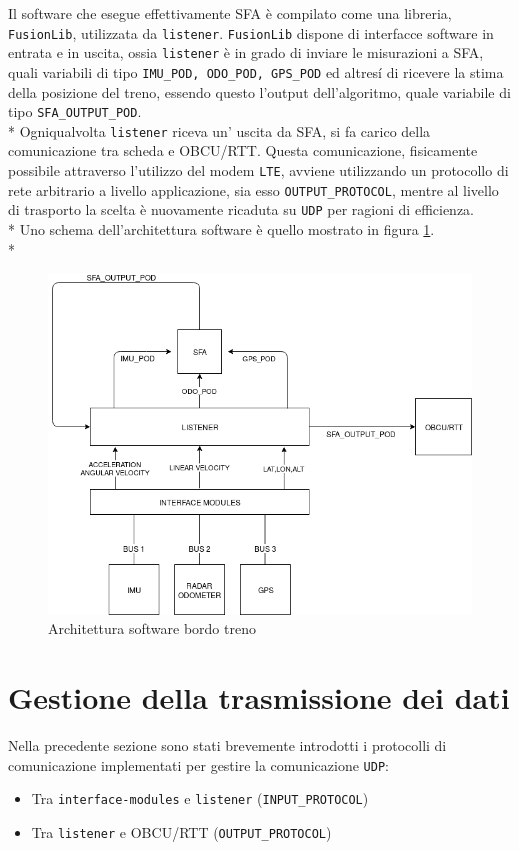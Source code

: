 Il software che esegue effettivamente SFA \`e compilato come una libreria, \texttt{FusionLib}, utilizzata da \texttt{listener}. \texttt{FusionLib} dispone di interfacce software in entrata e in uscita, ossia \texttt{listener} \`e in grado di inviare le misurazioni a SFA, quali variabili di tipo \texttt{IMU\_POD, ODO\_POD, GPS\_POD} ed altres\'i di ricevere la stima della posizione del treno, essendo questo l'output dell'algoritmo, quale variabile di tipo \texttt{SFA\_OUTPUT\_POD}.\\*
Ogniqualvolta \texttt{listener} riceva un' uscita da SFA, si fa carico della comunicazione tra scheda e OBCU/RTT. Questa comunicazione, fisicamente possibile attraverso l'utilizzo del modem \texttt{LTE}, avviene utilizzando un protocollo di rete arbitrario a livello applicazione, sia esso \texttt{OUTPUT\_PROTOCOL}, mentre al livello di trasporto la scelta \`e nuovamente ricaduta su \texttt{UDP} per ragioni di efficienza.\\*
Uno schema dell'architettura software \`e quello mostrato in figura \ref{fig:tdiagramint}.\\*
\begin{figure}[h]
	\centering
	\includegraphics[width=\linewidth]{img/InternalTrainSchema}
	\caption{Architettura software bordo treno}
	\label{fig:tdiagramint}
\end{figure}\newpage
\section{Gestione della trasmissione dei dati}
Nella precedente sezione sono stati brevemente introdotti i protocolli di comunicazione implementati per gestire la comunicazione \texttt{UDP}:
\begin{itemize}
	\item Tra \texttt{interface-modules} e \texttt{listener} (\texttt{INPUT\_PROTOCOL})
	\item Tra \texttt{listener} e OBCU/RTT (\texttt{OUTPUT\_PROTOCOL})
\end{itemize}
